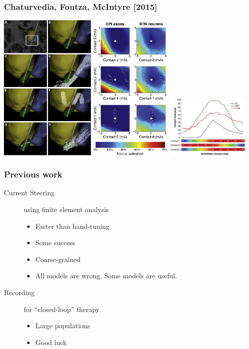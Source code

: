\documentclass{beamer}
\begin{document}
\begin{frame}
  \frametitle{Chaturvedia, Foutza, McIntyre [2015]}
  \includegraphics[width=0.35\textwidth]{chaturvedi-steering-0}
  \includegraphics[width=0.3\textwidth]{chaturvedi-steering-1}
  \includegraphics[width=0.3\textwidth]{chaturvedi-steering-2}
\end{frame}


\begin{frame}
  \frametitle{Previous work}
  \begin{description}
  \item[Current Steering] using finite element analysis
    \begin{itemize}
    \item Faster than hand-tuning
    \item Some success
    \item Coarse-grained
    \item All models are wrong.  Some models are useful.
    \end{itemize}
  \item[Recording] for ``closed-loop'' therapy
    \begin{itemize}
    \item Large populations
    \item Good luck
    \end{itemize}
  \end{description}
\end{frame}
\end{document}

